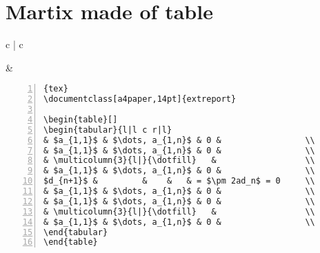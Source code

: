 \section{Martix made of table}
\begin{tabular}{c | c}

\begin{minipage}[m]{0.4\textwidth}

\end{minipage}
&
\begin{minipage}[m]{0.55\textwidth}
\renewcommand\textminus{\mbox{-}}%
\begin{lstlisting}[numberstyle=\zebra{green!15}{yellow!15},numbers=left,basicstyle=\footnotesize]{tex}
\documentclass[a4paper,14pt]{extreport}

\begin{table}[]
\begin{tabular}{l|l c r|l}
& $a_{1,1}$ & $\dots, a_{1,n}$ & 0 &                 \\  
& $a_{1,1}$ & $\dots, a_{1,n}$ & 0 &                 \\ 
& \multicolumn{3}{l|}{\dotfill}   &                  \\  
& $a_{1,1}$ & $\dots, a_{1,n}$ & 0 &                 \\ 
$d_{n+1}$ &         &    &   & = $\pm 2ad_n$ = 0     \\  
& $a_{1,1}$ & $\dots, a_{1,n}$ & 0 &                 \\  
& $a_{1,1}$ & $\dots, a_{1,n}$ & 0 &                 \\ 
& \multicolumn{3}{l|}{\dotfill}   &                  \\ 
& $a_{1,1}$ & $\dots, a_{1,n}$ & 0 &                 \\ 
\end{tabular}
\end{table}

\end{lstlisting}
\end{minipage}
\end{tabular}

